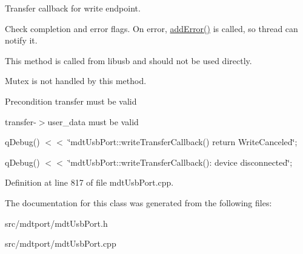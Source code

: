 Transfer callback for write endpoint. 

Check completion and error flags. On error, \hyperlink{classmdt_usb_port_aa857e94b4167c53b26573042ee3af280}{addError()} is called, so thread can notify it.

This method is called from libusb and should not be used directly.

Mutex is not handled by this method.

\begin{DoxyPrecond}{Precondition}
transfer must be valid 

transfer-\/$>$user\_\-data must be valid 
\end{DoxyPrecond}


qDebug() $<$$<$ \char`\"{}mdtUsbPort::writeTransferCallback() return WriteCanceled\char`\"{};

qDebug() $<$$<$ \char`\"{}mdtUsbPort::writeTransferCallback(): device disconnected\char`\"{}; 



Definition at line 817 of file mdtUsbPort.cpp.



The documentation for this class was generated from the following files:\begin{DoxyCompactItemize}
\item 
src/mdtport/mdtUsbPort.h\item 
src/mdtport/mdtUsbPort.cpp\end{DoxyCompactItemize}
